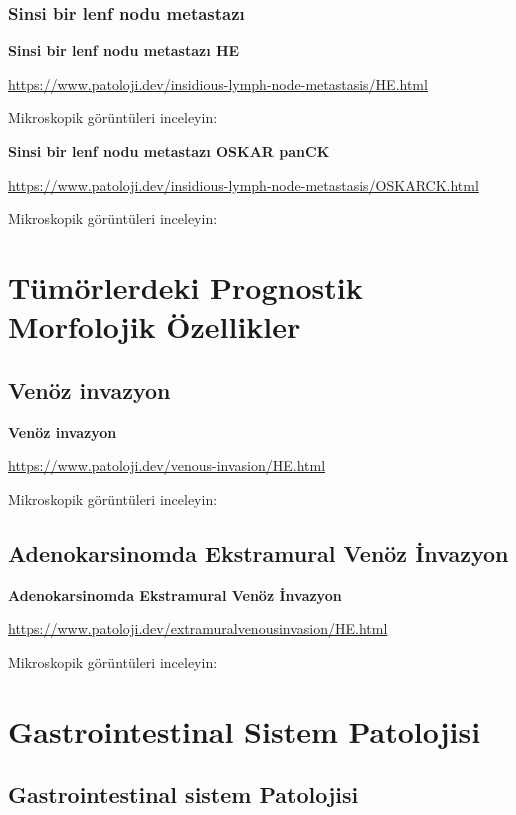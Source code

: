 \documentclass[
  letterpaper,
  DIV=11,
  numbers=noendperiod]{scrreprt}
\begin{document}
\hypertarget{sinsi-bir-lenf-nodu-metastazux131}{%
\section{Sinsi bir lenf nodu
metastazı}\label{sinsi-bir-lenf-nodu-metastazux131}}

\textbf{Sinsi bir lenf nodu metastazı HE}

\url{https://www.patoloji.dev/insidious-lymph-node-metastasis/HE.html}

Mikroskopik görüntüleri inceleyin:

\textbf{Sinsi bir lenf nodu metastazı OSKAR panCK}

\url{https://www.patoloji.dev/insidious-lymph-node-metastasis/OSKARCK.html}

Mikroskopik görüntüleri inceleyin:

\part{Tümörlerdeki Prognostik Morfolojik Özellikler}

\hypertarget{venuxf6z-invazyon}{%
\chapter{Venöz invazyon}\label{venuxf6z-invazyon}}

\textbf{Venöz invazyon}

\url{https://www.patoloji.dev/venous-invasion/HE.html}

Mikroskopik görüntüleri inceleyin:

\hypertarget{adenokarsinomda-ekstramural-venuxf6z-invazyon}{%
\chapter{Adenokarsinomda Ekstramural Venöz
İnvazyon}\label{adenokarsinomda-ekstramural-venuxf6z-invazyon}}

\textbf{Adenokarsinomda Ekstramural Venöz İnvazyon}

\url{https://www.patoloji.dev/extramuralvenousinvasion/HE.html}

Mikroskopik görüntüleri inceleyin:

\part{Gastrointestinal Sistem Patolojisi}

\hypertarget{gastrointestinal-sistem-patolojisi-1}{%
\chapter{Gastrointestinal sistem
Patolojisi}\label{gastrointestinal-sistem-patolojisi-1}}
\end{document}
